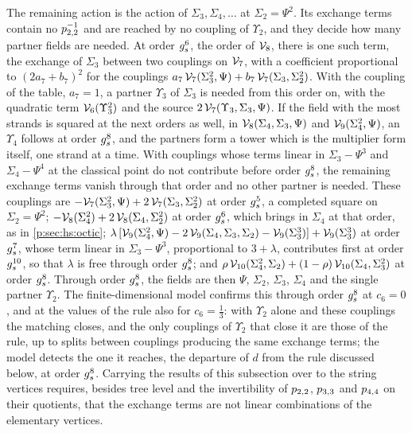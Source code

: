 The remaining action is the action of $\Sigma_3, \Sigma_4, \ldots$ at $\Sigma_2 = \Psi^2$.
  Its exchange terms contain no $p_{2,2}^{-1}$ and are reached by no coupling of $\Upsilon_2$, and they decide how many partner fields are needed.
  At order $g_s^6$, the order of $\mathcal{V}_{8}$, there is one such term, the exchange of $\Sigma_3$ between two couplings on $\mathcal{V}_{7}$, with a coefficient proportional to $(2 a_7 + b_7)^2$ for the couplings $a_7 \, \mathcal{V}_{7}(\Sigma_3^2, \Psi) + b_7 \, \mathcal{V}_{7}(\Sigma_3, \Sigma_2^2)$.
  With the coupling of the table, $a_7 = 1$, a partner $\Upsilon_3$ of $\Sigma_3$ is needed from this order on, with the quadratic term $\mathcal{V}_{6}(\Upsilon_3^2)$ and the source $2 \, \mathcal{V}_{7}(\Upsilon_3, \Sigma_3, \Psi)$.
  If the field with the most strands is squared at the next orders as well, in $\mathcal{V}_{8}(\Sigma_4, \Sigma_3, \Psi)$ and $\mathcal{V}_{9}(\Sigma_4^2, \Psi)$, an $\Upsilon_4$ follows at order $g_s^8$, and the partners form a tower which is the multiplier form itself, one strand at a time.
  With couplings whose terms linear in $\Sigma_3 - \Psi^3$ and $\Sigma_4 - \Psi^4$ at the classical point do not contribute before order $g_s^8$, the remaining exchange terms vanish through that order and no other partner is needed.
  These couplings are $- \mathcal{V}_{7}(\Sigma_3^2, \Psi) + 2 \, \mathcal{V}_{7}(\Sigma_3, \Sigma_2^2)$ at order $g_s^5$, a completed square on $\Sigma_2 = \Psi^2$; $- \mathcal{V}_{8}(\Sigma_4^2) + 2 \, \mathcal{V}_{8}(\Sigma_4, \Sigma_2^2)$ at order $g_s^6$, which brings in $\Sigma_4$ at that order, as in \cref{p:sec:hs:octic}; $\lambda \, [\mathcal{V}_{9}(\Sigma_4^2, \Psi) - 2 \, \mathcal{V}_{9}(\Sigma_4, \Sigma_3, \Sigma_2) - \mathcal{V}_{9}(\Sigma_3^3)] + \mathcal{V}_{9}(\Sigma_3^3)$ at order $g_s^7$, whose term linear in $\Sigma_3 - \Psi^3$, proportional to $3 + \lambda$, contributes first at order $g_s^{10}$, so that $\lambda$ is free through order $g_s^8$; and $\rho \, \mathcal{V}_{10}(\Sigma_4^2, \Sigma_2) + (1 - \rho) \, \mathcal{V}_{10}(\Sigma_4, \Sigma_3^2)$ at order $g_s^8$.
  Through order $g_s^8$, the fields are then $\Psi$, $\Sigma_2$, $\Sigma_3$, $\Sigma_4$ and the single partner $\Upsilon_2$.
  The finite-dimensional model confirms this through order $g_s^8$ at $c_6 = 0$, and at the values of the rule also for $c_6 = \frac{1}{3}$: with $\Upsilon_2$ alone and these couplings the matching closes, and the only couplings of $\Upsilon_2$ that close it are those of the rule, up to splits between couplings producing the same exchange terms; the model detects the one it reaches, the departure of $d$ from the rule discussed below, at order $g_s^8$.
  Carrying the results of this subsection over to the string vertices requires, besides tree level and the invertibility of $p_{2,2}$, $p_{3,3}$ and $p_{4,4}$ on their quotients, that the exchange terms are not linear combinations of the elementary vertices.

